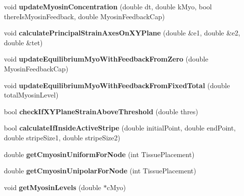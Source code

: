 \begin{DoxyCompactItemize}
\item 
\hypertarget{classShapeBase_aa5af6d7dda5ce1f12bf644d06b1f151c}{}void {\bfseries update\+Myosin\+Concentration} (double dt, double k\+Myo, bool there\+Is\+Myosin\+Feedback, double Myosin\+Feedback\+Cap)\label{classShapeBase_aa5af6d7dda5ce1f12bf644d06b1f151c}

\item 
\hypertarget{classShapeBase_a52c8bd76ad2d14cab37563fcdeff1b20}{}void {\bfseries calculate\+Principal\+Strain\+Axes\+On\+X\+Y\+Plane} (double \&e1, double \&e2, double \&tet)\label{classShapeBase_a52c8bd76ad2d14cab37563fcdeff1b20}

\item 
\hypertarget{classShapeBase_a6d50f91e2e243539cfa67b8c0f28612e}{}void {\bfseries update\+Equilibrium\+Myo\+With\+Feedback\+From\+Zero} (double Myosin\+Feedback\+Cap)\label{classShapeBase_a6d50f91e2e243539cfa67b8c0f28612e}

\item 
\hypertarget{classShapeBase_a842a99fa11e8bd7293644ccb0b99ba3a}{}void {\bfseries update\+Equilibrium\+Myo\+With\+Feedback\+From\+Fixed\+Total} (double total\+Myosin\+Level)\label{classShapeBase_a842a99fa11e8bd7293644ccb0b99ba3a}

\item 
\hypertarget{classShapeBase_a61b4685d3e89fae029b56ca3f81fb5d6}{}bool {\bfseries check\+If\+X\+Y\+Plane\+Strain\+Above\+Threshold} (double thres)\label{classShapeBase_a61b4685d3e89fae029b56ca3f81fb5d6}

\item 
\hypertarget{classShapeBase_abfb5933433de7f4f6c58734be0faeac2}{}bool {\bfseries calculate\+If\+Inside\+Active\+Stripe} (double initial\+Point, double end\+Point, double stripe\+Size1, double stripe\+Size2)\label{classShapeBase_abfb5933433de7f4f6c58734be0faeac2}

\item 
\hypertarget{classShapeBase_a1a1d8053c99109b0c13b06b2cca44dee}{}double {\bfseries get\+Cmyosin\+Uniform\+For\+Node} (int Tissue\+Placement)\label{classShapeBase_a1a1d8053c99109b0c13b06b2cca44dee}

\item 
\hypertarget{classShapeBase_a69ec8a1780b516d47560a25ba17f672a}{}double {\bfseries get\+Cmyosin\+Unipolar\+For\+Node} (int Tissue\+Placement)\label{classShapeBase_a69ec8a1780b516d47560a25ba17f672a}

\item 
\hypertarget{classShapeBase_afa44aa076cefed9d57f61dce7574832a}{}void {\bfseries get\+Myosin\+Levels} (double $\ast$c\+Myo)\label{classShapeBase_afa44aa076cefed9d57f61dce7574832a}


\end{DoxyCompactItemize}

